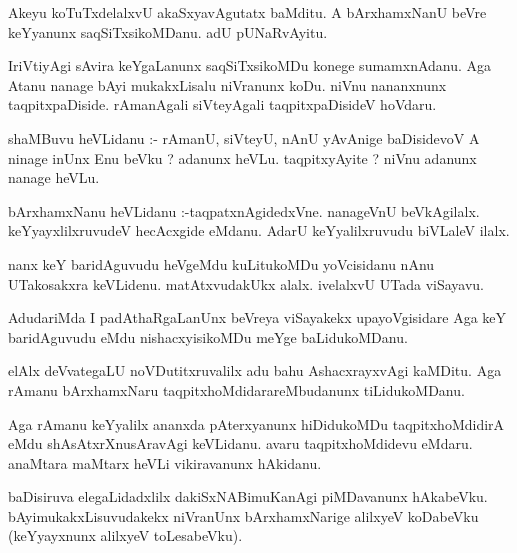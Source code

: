 \documentclass{article}
\begin{document}
\begin{mn}
Akeyu  koTuTxdelalxvU  akaSxyavAgutatx  baMditu.  A  bArxhamxNanU  beVre  keYyanunx  saqSiTxsikoMDanu.  adU  pUNaRvAyitu.
\end{mn}

\begin{mn}
IriVtiyAgi  sAvira  keYgaLanunx  saqSiTxsikoMDu  konege  sumamxnAdanu.  Aga  Atanu  nanage  bAyi  mukakxLisalu  niVranunx  
koDu.  niVnu  nananxnunx  taqpitxpaDiside.  rAmanAgali  siVteyAgali  taqpitxpaDisideV  hoVdaru.
\end{mn}

\begin{mn}
shaMBuvu  heVLidanu :- rAmanU,  siVteyU,  nAnU  yAvAnige  baDisidevoV  A  ninage  inUnx  Enu  beVku ?  adanunx  heVLu.  
taqpitxyAyite ?  niVnu  adanunx  nanage  heVLu.
\end{mn}

\begin{mn}
bArxhamxNanu  heVLidanu :-taqpatxnAgidedxVne.  nanageVnU  beVkAgilalx.  keYyayxlilxruvudeV  hecAcxgide  eMdanu.  AdarU  
keYyalilxruvudu  biVLaleV  ilalx.
\end{mn}

\begin{mn}
nanx  keY  baridAguvudu  heVgeMdu  kuLitukoMDu  yoVcisidanu  nAnu  UTakosakxra  keVLidenu.  matAtxvudakUkx  alalx.  
ivelalxvU  UTada  viSayavu.
\end{mn}

\begin{mn}
AdudariMda  I  padAthaRgaLanUnx  beVreya  viSayakekx  upayoVgisidare  Aga  keY  baridAguvudu  eMdu  nishacxyisikoMDu  
meYge  baLidukoMDanu.
\end{mn}

\begin{mn}
elAlx  deVvategaLU  noVDutitxruvalilx  adu  bahu  AshacxrayxvAgi  kaMDitu.  Aga  rAmanu  bArxhamxNaru  
taqpitxhoMdidarareMbudanunx  tiLidukoMDanu.
\end{mn}

\begin{mn}
Aga  rAmanu  keYyalilx  ananxda  pAterxyanunx  hiDidukoMDu  taqpitxhoMdidirA  eMdu  shAsAtxrXnusAravAgi  keVLidanu.  
avaru  taqpitxhoMdidevu  eMdaru.  anaMtara  maMtarx  heVLi  vikiravanunx  hAkidanu.
\end{mn}

\begin{mn}
baDisiruva  elegaLidadxlilx  dakiSxNABimuKanAgi  piMDavanunx  hAkabeVku.  bAyimukakxLisuvudakekx  niVranUnx  bArxhamxNarige  
alilxyeV  koDabeVku (keYyayxnunx  alilxyeV  toLesabeVku).
\end{mn}
\end{document}
